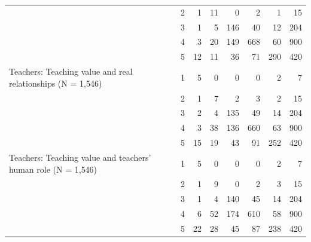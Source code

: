 \begin{longtable}{@{}p{}rrrrrrr@{}}
 & 2 & 1 & 11 & 0 & 2 & 1 & 15 \\
 & 3 & 1 & 5 & 146 & 40 & 12 & 204 \\
 & 4 & 3 & 20 & 149 & 668 & 60 & 900 \\
 & 5 & 12 & 11 & 36 & 71 & 290 & 420 \\
\midrule
Teachers: Teaching value and real relationships (N = 1{,}546) & 1 & 5 & 0 & 0 & 0 & 2 & 7 \\
 & 2 & 1 & 7 & 2 & 3 & 2 & 15 \\
 & 3 & 2 & 4 & 135 & 49 & 14 & 204 \\
 & 4 & 3 & 38 & 136 & 660 & 63 & 900 \\
 & 5 & 15 & 19 & 43 & 91 & 252 & 420 \\
\midrule
Teachers: Teaching value and teachers' human role (N = 1{,}546) & 1 & 5 & 0 & 0 & 0 & 2 & 7 \\
 & 2 & 1 & 9 & 0 & 2 & 3 & 15 \\
 & 3 & 1 & 4 & 140 & 45 & 14 & 204 \\
 & 4 & 6 & 52 & 174 & 610 & 58 & 900 \\
 & 5 & 22 & 28 & 45 & 87 & 238 & 420 \\
\end{longtable}
\normalsize
